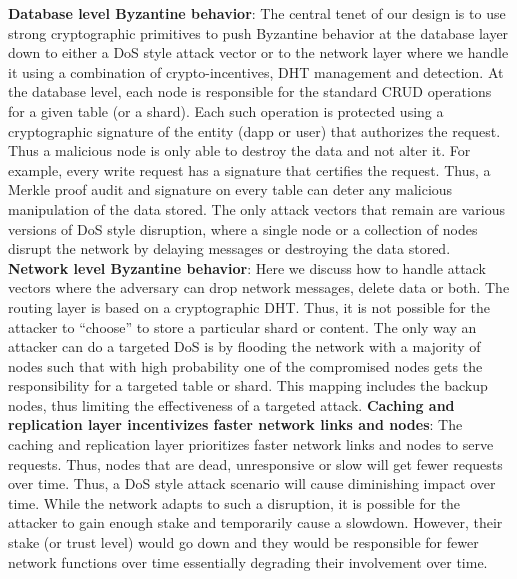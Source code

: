 \documentclass[preprint,10pt]{elsarticle}
\begin{document}
\newline\newline
\textbf{Database level Byzantine behavior}: The central tenet of our design is to use strong cryptographic primitives to push Byzantine behavior at the database layer down to either a DoS style attack vector or to the network layer where we handle it using a combination of crypto-incentives, DHT management and detection. At the database level, each node is responsible for the standard CRUD operations for a given table (or a shard). Each such operation is protected using a cryptographic signature of the entity (dapp or user) that authorizes the request. Thus a malicious node is only able to destroy the data and not alter it. For example, every write request has a signature that certifies the request. Thus, a Merkle proof audit and signature on every table can deter any malicious manipulation of the data stored. The only attack vectors that remain are various versions of DoS style disruption, where a single node or a collection of nodes disrupt the network by delaying messages or destroying the data stored. 
\newline\newline
\textbf{Network level Byzantine behavior}: Here we discuss how to handle attack vectors where the adversary can drop network messages, delete data or both. The routing layer is based on a cryptographic DHT. Thus, it is not possible for the attacker to “choose” to store a particular shard or content. The only way an attacker can do a targeted DoS is by flooding the network with a majority of nodes such that with high probability one of the compromised nodes gets the responsibility for a targeted table or shard. This mapping includes the backup nodes, thus limiting the effectiveness of a targeted attack.
\newline\newline
\textbf{Caching and replication layer incentivizes faster network links and nodes}:
The caching and replication layer prioritizes faster network links and nodes to serve requests. Thus, nodes that are dead, unresponsive or slow will get fewer requests over time. Thus, a DoS style attack scenario will cause diminishing impact over time. While the network adapts to such a disruption, it is possible for the attacker to gain enough stake and temporarily cause a slowdown. However, their stake (or trust level) would go down and they would be responsible for fewer network functions over time essentially degrading their involvement over time.	
\newline\newline
\end{document}
